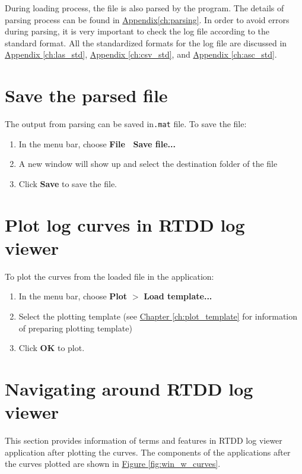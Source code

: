\documentclass[12pt,a4paper,oneside]{report}
\begin{document}
During loading process, the file is also parsed by the program. The details of parsing process can be found in \hyperref[ch:parsing]{Appendix\ref{ch:parsing}}. In order to avoid errors during parsing, it is very important to check the log file according to the standard format. All the standardized formats for the log file are discussed in \hyperref[ch:las_std]{Appendix \ref{ch:las_std}}, \hyperref[ch:csv_std]{Appendix \ref{ch:csv_std}}, and \hyperref[ch:asc_std]{Appendix \ref{ch:asc_std}}.


\section{Save the parsed file}
\label{ch:save_file}
The output from parsing can be saved in\texttt{.mat} file. To save the file:
\begin{enumerate}
\item In the menu bar, choose \textbf{File $\>$ Save file...}
\item A new window will show up and select the destination folder of the file
\item Click \textbf{Save} to save the file.
\end{enumerate}

\section{Plot log curves in RTDD log viewer}
To plot the curves from the loaded file in the application:
\begin{enumerate}
\item In the menu bar, choose \textbf{Plot} $>$ \textbf{Load template...}
\item Select the plotting template (see \hyperref[ch:plot_template]{Chapter \ref{ch:plot_template}} for information of preparing plotting template)
\item Click \textbf{OK} to plot.
\end{enumerate}

\section{Navigating around RTDD log viewer}
This section provides information of terms and features in RTDD log viewer application after plotting the curves. The components of the applications after the curves plotted are shown in \hyperref[fig:win_w_curves]{Figure \ref{fig:win_w_curves}}.
\end{document}

